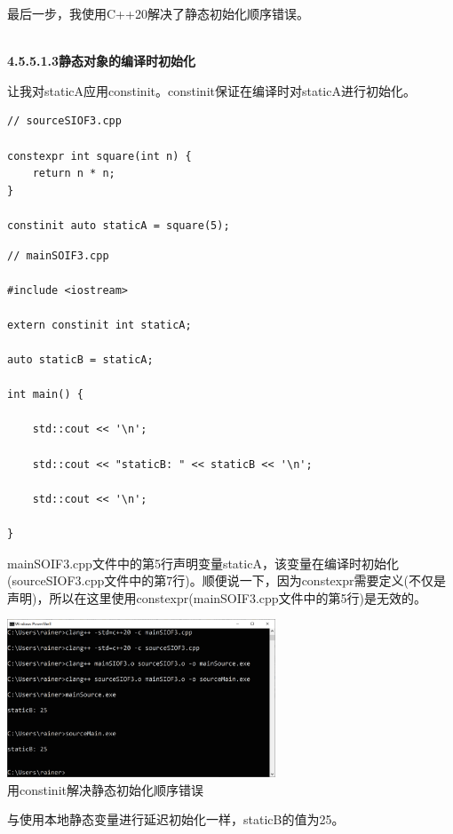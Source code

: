最后一步，我使用C++20解决了静态初始化顺序错误。

\hspace*{\fill} \\ %
\noindent
\textbf{4.5.5.1.3\hspace{0.2cm}静态对象的编译时初始化}

让我对staticA应用constinit。constinit保证在编译时对staticA进行初始化。

\begin{lstlisting}[style=styleCXX]
// sourceSIOF3.cpp

constexpr int square(int n) {
	return n * n;
}

constinit auto staticA = square(5);
\end{lstlisting}

\begin{lstlisting}[style=styleCXX]
// mainSOIF3.cpp

#include <iostream>

extern constinit int staticA;

auto staticB = staticA;

int main() {
	
	std::cout << '\n';
	
	std::cout << "staticB: " << staticB << '\n';
	
	std::cout << '\n';

}
\end{lstlisting}

mainSOIF3.cpp文件中的第5行声明变量staticA，该变量在编译时初始化(sourceSIOF3.cpp文件中的第7行)。顺便说一下，因为constexpr需要定义(不仅是声明)，所以在这里使用constexpr(mainSOIF3.cpp文件中的第5行)是无效的。

\begin{center}
\includegraphics[width=0.6\textwidth]{content/3/chapter4/images/39.png}\\
用constinit解决静态初始化顺序错误
\end{center}

与使用本地静态变量进行延迟初始化一样，staticB的值为25。

